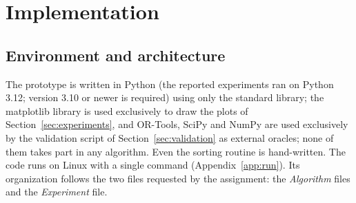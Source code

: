 \section{Implementation}\label{sec:implementation}

\subsection{Environment and architecture}

The prototype is written in Python (the reported experiments ran on Python 3.12; version 3.10 or newer is required) using only the standard library; the matplotlib library is used exclusively to draw the plots of Section~\ref{sec:experiments}, and OR-Tools, SciPy and NumPy are used exclusively by the validation script of Section~\ref{sec:validation} as external oracles; none of them takes part in any algorithm. Even the sorting routine is hand-written. The code runs on Linux with a single command (Appendix~\ref{app:run}). Its organization follows the two files requested by the assignment: the \emph{Algorithm} files and the \emph{Experiment} file.

